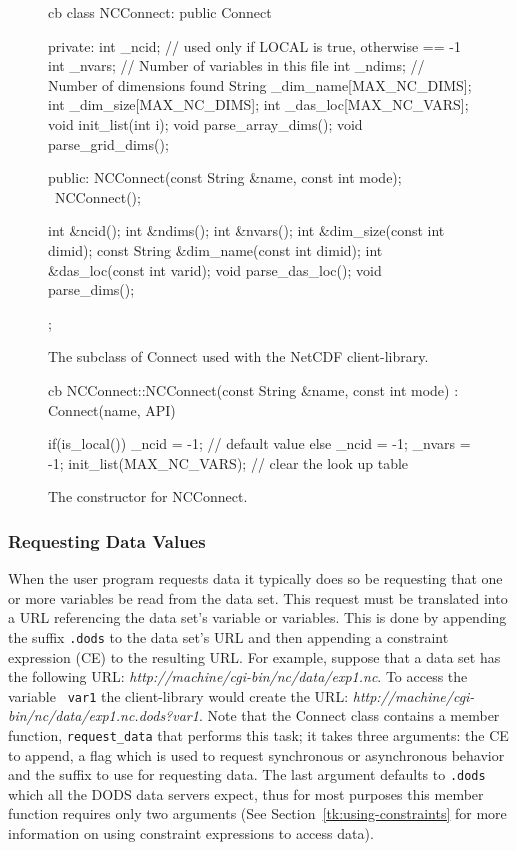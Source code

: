 \begin{figure}
\begin{code}{cb}
class NCConnect: public Connect {
private:
    int _ncid;                  // used only if LOCAL is true, otherwise == -1
    int _nvars;                 // Number of variables in this file
    int _ndims;                 // Number of dimensions found
    String _dim_name[MAX_NC_DIMS];
    int _dim_size[MAX_NC_DIMS];
    int _das_loc[MAX_NC_VARS];
    void init_list(int i);
    void parse_array_dims();
    void parse_grid_dims();

public:
    NCConnect(const String &name, const int mode);
    ~NCConnect();

    int &ncid();
    int &ndims();
    int &nvars();
    int &dim_size(const int dimid);
    const String &dim_name(const int dimid);
    int &das_loc(const int varid);
    void parse_das_loc();
    void parse_dims();
};
\end{code}
\caption{The subclass of Connect used with the NetCDF client-library.}
\label{fig:NCConnect}
\end{figure}

\begin{figure}
\begin{code}{cb}
NCConnect::NCConnect(const String &name, const int mode) : Connect(name, API)
{
    if(is_local()){
        _ncid = -1;             // default value
    }
    else {
        _ncid = -1;
        _nvars = -1;
        init_list(MAX_NC_VARS); // clear the look up table
    }

}       
\end{code}
\caption{The constructor for NCConnect.}
\label{fig:NCConnect-ctor}
\end{figure}

\subsubsection{Requesting Data Values}
\label{tk:requesting-data}

When the user program requests data it typically does so be requesting that
one or more variables be read from the data set. This request must be
translated into a URL referencing the data set's variable or variables. This
is done by appending the suffix {\tt .dods} to the data set's URL and then
appending a constraint expression (CE) to the resulting URL. For example,
suppose that a data set has the following URL: {\em
  http://machine/cgi-bin/nc/data/exp1.nc}. To access the variable {\tt
  var1} the client-library would create the URL: {\em
  http://machine/cgi-bin/nc/data/exp1.nc.dods?var1\/}. Note that the Connect
class contains a member function, {\tt request\_data} that performs this
task; it takes three arguments: the CE to append, a flag which is used to
request synchronous or asynchronous behavior and the suffix to use for
requesting data. The last argument defaults to {\tt .dods} which all the DODS
data servers expect, thus for most purposes this member function requires
only two arguments (See Section~\ref{tk:using-constraints} for more
information on using constraint expressions to access data).


